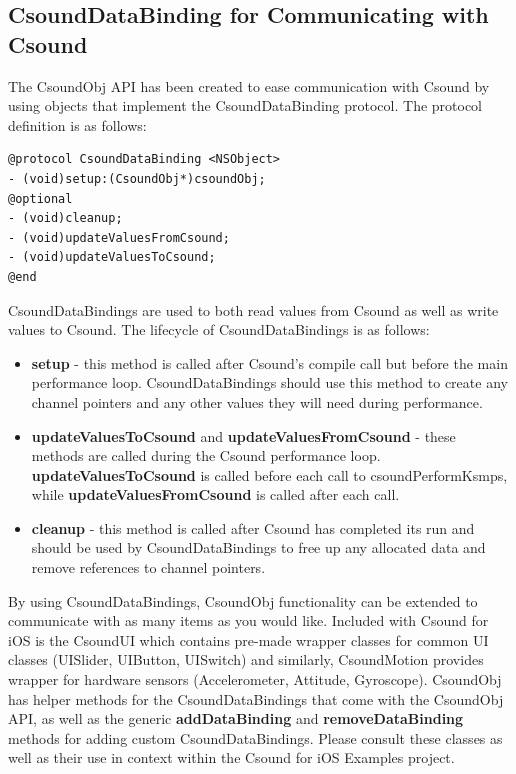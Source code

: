 \documentclass[11pt]{article}
\begin{document}
\subsection{CsoundDataBinding for Communicating with Csound}

The CsoundObj API has been created to ease communication with Csound by using objects that implement the CsoundDataBinding protocol.  The protocol definition is as follows:

\begin{lstlisting}[caption=CsoundDataBinding Protocol Definition]
@protocol CsoundDataBinding <NSObject>
- (void)setup:(CsoundObj*)csoundObj;
@optional
- (void)cleanup;
- (void)updateValuesFromCsound;
- (void)updateValuesToCsound;
@end
\end{lstlisting}

CsoundDataBindings are used to both read values from Csound as well as write values to Csound.  The lifecycle of CsoundDataBindings is as follows:

\begin{itemize}
\item \textbf{setup} - this method is called after Csound's compile call but before the main performance loop. CsoundDataBindings should use this method to create any channel pointers and any other values they will need during performance.
\item \textbf{updateValuesToCsound} and \textbf{updateValuesFromCsound} - these methods are called during the Csound performance loop. \textbf{updateValuesToCsound} is called before each call to csoundPerformKsmps, while \textbf{updateValuesFromCsound} is called after each call.
\item \textbf{cleanup} - this method is called after Csound has completed its run and should be used by CsoundDataBindings to free up any allocated data and remove references to channel pointers.
\end{itemize}

By using CsoundDataBindings, CsoundObj functionality can be extended to communicate with as many items as you would like. Included with Csound for iOS is the CsoundUI which contains pre-made wrapper classes for common UI classes (UISlider, UIButton, UISwitch) and similarly, CsoundMotion provides wrapper for hardware sensors (Accelerometer, Attitude, Gyroscope).  CsoundObj has helper methods for the CsoundDataBindings that come with the CsoundObj API, as well as the generic \textbf{addDataBinding} and \textbf{removeDataBinding} methods for adding custom CsoundDataBindings. Please consult these classes as well as their use in context within the Csound for iOS Examples project.
\end{document}
